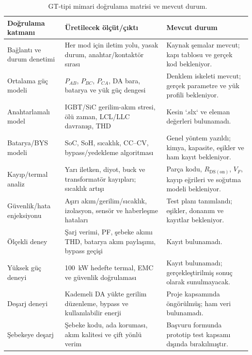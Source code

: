 \begin{table}[htbp]
  \centering
  \caption{\juriistegietiketi\ GT-tipi mimari doğrulama matrisi ve mevcut durum.}
  \label{tab:gt-dogrulama-matrisi}
  \small
  \begin{tabularx}{\textwidth}{@{}p{}p{}X@{}}
    \toprule
    Doğrulama katmanı & Üretilecek ölçüt/çıktı & Mevcut durum \\
    \midrule
    Bağlantı ve durum denetimi & Her mod için iletim yolu, yasak durum, anahtar/kontaktör sırası & Kaynak şemalar mevcut; kapı tablosu ve gerçek kod bekleniyor. \\
    Ortalama güç modeli & $P_{AB}$, $P_{BC}$, $P_{CA}$, DA bara, batarya ve yük güç dengesi & Denklem iskeleti mevcut; gerçek parametre ve yük profili bekleniyor. \\
    Anahtarlamalı model & IGBT/SiC gerilim-akım stresi, ölü zaman, LCL/LLC davranışı, THD & Kesin `.slx` ve eleman değerleri bulunamadı. \\
    Batarya/BYS modeli & SoC, SoH, sıcaklık, CC--CV, bypass/yedekleme algoritması & Genel yöntem yazıldı; kimya, kapasite, eşikler ve ham kayıt bekleniyor. \\
    Kayıp/termal analiz & Yarı iletken, diyot, buck ve transformatör kayıpları; sıcaklık artışı & Parça kodu, $R_{\mathrm{DS(on)}}$, $V_F$, kayıp eğrileri ve soğutma modeli bekleniyor. \\
    Güvenlik/hata enjeksiyonu & Aşırı akım/gerilim/sıcaklık, izolasyon, sensör ve haberleşme hataları & Test planı tanımlandı; eşikler, donanım ve kayıtlar bekleniyor. \\
    Ölçekli deney & Şarj verimi, PF, şebeke akımı THD, batarya akım paylaşımı, bypass geçişi & Kayıt bulunamadı. \\
    Yüksek güç deneyi & \SI{100}{\kilo\watt} hedefte termal, EMC ve güvenlik doğrulaması & Kayıt bulunamadı; gerçekleştirilmiş sonuç olarak sunulmayacak. \\
    Deşarj deneyi & Kademeli DA yükte gerilim düzenleme, bypass ve kullanılabilir enerji & Proje kapsamında öngörülmüş; ham veri bulunamadı. \\
    Şebekeye deşarj & Şebeke kodu, ada koruması, akım kalitesi ve çift yönlü verim & Başvuru formunda prototip test kapsamı dışında bırakılmıştır. \\
    \bottomrule
  \end{tabularx}
\end{table}

